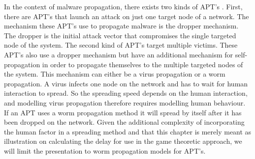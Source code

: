 In the context of malware propagation, there exists two kinds of APT's . First, there are APT's that launch an attack on just one target node of a network. The mechanism these APT's use to propagate malware is the dropper mechanism. The dropper is the initial attack vector that compromises the single targeted node of the system. The second kind of APT's target multiple victims. These APT's also use a dropper mechanism but have an additional mechanism for self-propagation in order to propagate themselves to the multiple targeted nodes of the system. This mechanism can either be a virus propagation or a worm propagation. A virus infects one node on the network and has to wait for human interaction to spread. So the spreading speed depends on the human interaction, and modelling virus propagation therefore requires modelling human behaviour. If an APT uses a worm propagation method it will spread by itself after it has been dropped on the network. Given the additional complexity of incorporating the human factor in a spreading method and that this chapter is merely meant as illustration on calculating the delay for use in the game theoretic approach, we will limit the presentation to worm propagation models for APT's. \\

